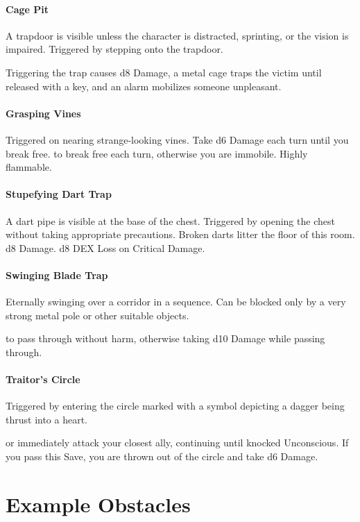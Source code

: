 \documentclass[itdr/core]{subfiles}
\begin{document}
\vfill
\paragraph{Cage Pit}
A trapdoor is visible unless the character is distracted, sprinting, or the vision is impaired. Triggered by stepping onto the trapdoor.

Triggering the trap causes d8 Damage, a metal cage traps the victim until released with a key, and an alarm mobilizes someone unpleasant.

\vfill
\paragraph{Grasping Vines}
Triggered on nearing strange-looking vines. Take d6 Damage each turn until you break free.  to break free each turn, otherwise you are immobile. Highly flammable.

\vfill
\paragraph{Stupefying Dart Trap}
A dart pipe is visible at the base of the chest. Triggered by opening the chest without taking appropriate precautions. Broken darts litter the floor of this room.
d8 Damage. d8 DEX Loss on Critical Damage.

\vfill
\paragraph{Swinging Blade Trap}
Eternally swinging over a corridor in a sequence. Can be blocked only by a very strong metal pole or other suitable objects.

 to pass through without harm, otherwise taking d10 Damage while passing through.

\vfill
\paragraph{Traitor's Circle}
Triggered by entering the circle marked with a symbol depicting a dagger being thrust into a heart.

 or immediately attack your closest ally, continuing until knocked Unconscious. If you pass this Save, you are thrown out of the circle and take d6 Damage.

\vfill
\break

\section{Example Obstacles}
\end{document}
